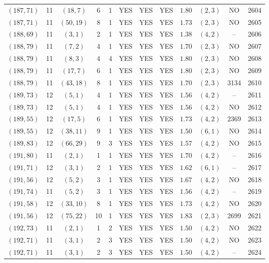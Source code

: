 \begin{longtable}{|c|c|c|c|c|c|c|c|c|c|c|c|}
$(187,71)$ & 11 & $(18,7)$ & 6 & 1 & YES & YES & YES & $1.80$ & $(2,3)$ & NO & 2604\\
$(187,71)$ & 11 & $(50,19)$ & 8 & 1 & YES & YES & YES & $1.73$ & $(2,3)$ & NO & 2605\\
$(188,69)$ & 11 & $(3,1)$ & 2 & 1 & YES & YES & YES & $1.38$ & $(4,2)$ & -- & 2606\\
$(188,79)$ & 11 & $(7,2)$ & 4 & 1 & YES & YES & YES & $1.70$ & $(2,3)$ & NO & 2607\\
$(188,79)$ & 11 & $(8,3)$ & 4 & 4 & YES & YES & YES & $1.80$ & $(2,3)$ & NO & 2608\\
$(188,79)$ & 11 & $(17,7)$ & 6 & 1 & YES & YES & YES & $1.80$ & $(2,3)$ & NO & 2609\\
$(188,79)$ & 11 & $(43,18)$ & 8 & 1 & YES & YES & YES & $1.70$ & $(2,3)$ & 3134 & 2610\\
$(189,73)$ & 12 & $(5,1)$ & 4 & 1 & YES & YES & YES & $1.56$ & $(4,2)$ & -- & 2611\\
$(189,73)$ & 12 & $(5,1)$ & 4 & 1 & YES & YES & YES & $1.56$ & $(4,2)$ & NO & 2612\\
$(189,55)$ & 12 & $(17,5)$ & 6 & 1 & YES & YES & YES & $1.73$ & $(4,2)$ & 2369 & 2613\\
$(189,55)$ & 12 & $(38,11)$ & 9 & 1 & YES & YES & YES & $1.50$ & $(6,1)$ & NO & 2614\\
$(189,83)$ & 12 & $(66,29)$ & 9 & 3 & YES & YES & YES & $1.57$ & $(4,2)$ & NO & 2615\\
$(191,80)$ & 11 & $(2,1)$ & 1 & 1 & YES & YES & YES & $1.70$ & $(4,2)$ & -- & 2616\\
$(191,71)$ & 12 & $(3,1)$ & 2 & 1 & YES & YES & YES & $1.62$ & $(6,1)$ & -- & 2617\\
$(191,56)$ & 12 & $(5,2)$ & 3 & 1 & YES & YES & YES & $1.67$ & $(4,2)$ & NO & 2618\\
$(191,74)$ & 11 & $(5,2)$ & 3 & 1 & YES & YES & YES & $1.56$ & $(4,2)$ & -- & 2619\\
$(191,58)$ & 12 & $(33,10)$ & 8 & 1 & YES & YES & YES & $1.73$ & $(4,2)$ & NO & 2620\\
$(191,56)$ & 12 & $(75,22)$ & 10 & 1 & YES & YES & YES & $1.83$ & $(2,3)$ & 2699 & 2621\\
$(192,73)$ & 11 & $(2,1)$ & 1 & 2 & YES & YES & YES & $1.50$ & $(4,2)$ & NO & 2622\\
$(192,71)$ & 11 & $(3,1)$ & 2 & 3 & YES & YES & YES & $1.50$ & $(4,2)$ & NO & 2623\\
$(192,71)$ & 11 & $(3,1)$ & 2 & 3 & YES & YES & YES & $1.50$ & $(4,2)$ & -- & 2624\\

\end{longtable}

